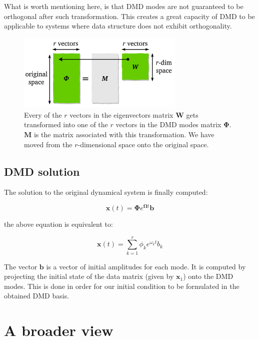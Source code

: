 \documentclass[10pt,twocolumn]{article}
\begin{document}
What is worth mentioning here, is that DMD modes are not guaranteed to be orthogonal after such transformation. This creates a great capacity of DMD to be applicable to systems where data structure does not exhibit orthogonality.

\begin{figure}[H]
\centering\includegraphics[width=8cm]{dmd-modes-transformation.png}
\caption{Every of the $r$ vectors in the eigenvectors matrix $\mathbf{W}$ gets transformed into one of the $r$ vectors in the DMD modes matrix $\mathbf{\Phi}$. $\mathbf{M}$ is the matrix associated with this transformation. We have moved from the $r$-dimensional space onto the original space.}
\label{fig:linear_system}
\end{figure}

\subsection{DMD solution}

The solution to the original dynamical system is finally computed:

\begin{equation} \label{eq:x-solution-matrix}
\mathbf{x}(t) = \mathbf{\Phi} e^{\mathbf{\Omega} t} \mathbf{b}
\end{equation}

the above equation is equivalent to:

\begin{equation} \label{eq:x-solution-summation}
\mathbf{x}(t)  = \sum_{k=1}^{r} \phi_k e^{\omega_k t} b_k
\end{equation}

The vector $\mathbf{b}$ is a vector of initial amplitudes for each mode. It is computed by projecting the initial state of the data matrix (given by $\mathbf{x}_1$) onto the DMD modes. This is done in order for our initial condition to be formulated in the obtained DMD basis.



\section{A broader view} \label{sec:view}
\end{document}
